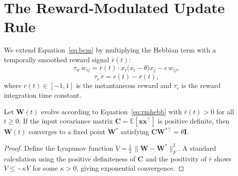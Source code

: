 \section{The Reward-Modulated Update Rule}

We extend Equation~\eqref{eq:bcm} by multiplying the Hebbian term with a temporally
smoothed reward signal $\bar{r}(t)$:
\begin{equation}
  \tau_w\,\dot{w}_{ij}
  = \bar{r}(t)\cdot x_i\bigl(x_i - \theta\bigr)x_j
    - \epsilon\,w_{ij},
  \label{eq:rmhebb}
\end{equation}
\begin{equation}
  \tau_r\,\dot{\bar{r}} = r(t) - \bar{r}(t),
  \label{eq:rewardfilter}
\end{equation}
where $r(t) \in [-1, 1]$ is the instantaneous reward and $\tau_r$ is the reward
integration time constant.

\begin{theorem}
\label{thm:convergence}
Let $\mathbf{W}(t)$ evolve according to Equation~\eqref{eq:rmhebb} with $\bar{r}(t) > 0$
for all $t \geq 0$.  If the input covariance matrix $\mathbf{C} = \mathbb{E}[\mathbf{x}\mathbf{x}^{\top}]$
is positive definite, then $\mathbf{W}(t)$ converges to a fixed point $\mathbf{W}^*$
satisfying $\mathbf{C}\mathbf{W}^{*\top} = \theta\mathbf{I}$.
\end{theorem}

\begin{proof}
Define the Lyapunov function $V = \tfrac{1}{2}\,\lVert \mathbf{W} - \mathbf{W}^* \rVert_F^2$.
A standard calculation using the positive definiteness of $\mathbf{C}$ and the
positivity of $\bar{r}$ shows $\dot{V} \leq -\kappa V$ for some $\kappa > 0$, giving
exponential convergence.
\end{proof}
